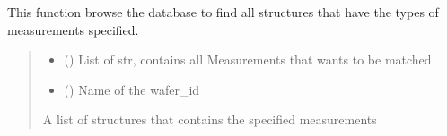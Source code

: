 \documentclass[letterpaper,10pt,english]{sphinxmanual}
\begin{document}
\begin{fulllineitems}
\label{\detokenize{filter:filter.filter_by_meas}}
\pysigstartsignatures
{}
\pysigstopsignatures
\sphinxAtStartPar
This function browse the database to find all structures that have the types of measurements specified.
\begin{quote}\begin{description}
\begin{itemize}
\item {} 
\sphinxAtStartPar
{} () \textendash{} List of str, contains all Measurements that wants to be matched

\item {} 
\sphinxAtStartPar
{} () \textendash{} Name of the wafer\_id

\end{itemize}

\sphinxAtStartPar
A list of structures that contains the specified measurements

\end{description}\end{quote}

\end{fulllineitems}

\end{document}

